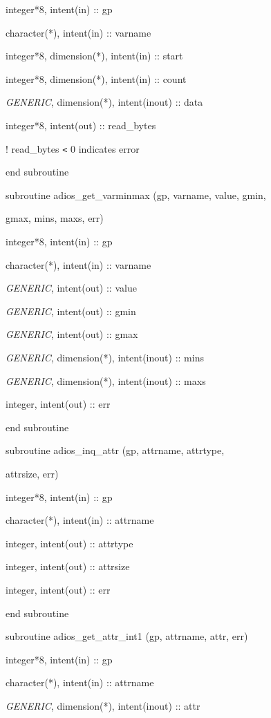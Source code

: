 \parindent=36pt
integer*8,      intent(in)  :: gp

character(*),   intent(in)  :: varname

integer*8, dimension(*), intent(in) :: start

integer*8, dimension(*), intent(in) :: count

\textit{GENERIC}, dimension(*), intent(inout) :: data

integer*8,      intent(out) :: read\_bytes

! read\_bytes \texttt{<} 0 indicates error

\parindent=0pt
end subroutine

subroutine adios\_get\_varminmax (gp, varname, value, gmin, 

\parindent=115pt
gmax, mins, maxs, err)

\parindent=36pt
integer*8,      intent(in)  :: gp

character(*),   intent(in)  :: varname

\textit{GENERIC},        intent(out) :: value

\textit{GENERIC},        intent(out) :: gmin

\textit{GENERIC},        intent(out) :: gmax

\textit{GENERIC}, dimension(*), intent(inout) :: mins

\textit{GENERIC}, dimension(*), intent(inout) :: maxs

integer,        intent(out) :: err

\parindent=0pt
end subroutine

subroutine adios\_inq\_attr (gp, attrname, attrtype, 

\parindent=97pt
attrsize, err)

\parindent=36pt
integer*8,      intent(in) :: gp

character(*),   intent(in)  :: attrname

integer,        intent(out) :: attrtype

integer,        intent(out) :: attrsize

integer,        intent(out) :: err

\parindent=0pt
end subroutine

subroutine adios\_get\_attr\_int1 (gp, attrname, attr, err)

\parindent=36pt
integer*8,      intent(in)  :: gp

character(*),   intent(in)  :: attrname

\textit{GENERIC}, dimension(*), intent(inout) :: attr

